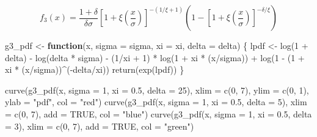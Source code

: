 \documentclass[
]{article}
\newenvironment{Shaded}{\begin{snugshade}}{\end{snugshade}}
\newcommand{\AttributeTok}[1]{\textcolor[rgb]{0.77,0.63,0.00}{#1}}
\newcommand{\ConstantTok}[1]{\textcolor[rgb]{0.00,0.00,0.00}{#1}}
\newcommand{\ControlFlowTok}[1]{\textcolor[rgb]{0.13,0.29,0.53}{\textbf{#1}}}
\newcommand{\DecValTok}[1]{\textcolor[rgb]{0.00,0.00,0.81}{#1}}
\newcommand{\FloatTok}[1]{\textcolor[rgb]{0.00,0.00,0.81}{#1}}
\newcommand{\FunctionTok}[1]{\textcolor[rgb]{0.00,0.00,0.00}{#1}}
\newcommand{\NormalTok}[1]{#1}
\newcommand{\OtherTok}[1]{\textcolor[rgb]{0.56,0.35,0.01}{#1}}
\newcommand{\SpecialCharTok}[1]{\textcolor[rgb]{0.00,0.00,0.00}{#1}}
\newcommand{\StringTok}[1]{\textcolor[rgb]{0.31,0.60,0.02}{#1}}
\begin{document}
\[f_3(x) = \frac{1 + \delta}{\delta\sigma}[1 + \xi (\frac{x}{\sigma})]^{-(1/\xi + 1)}\left(1 - [1+\xi(\frac{x}{\sigma})]^{-\delta/\xi} \right)\]

\begin{Shaded}
\begin{Highlighting}[]
\NormalTok{g3\_pdf }\OtherTok{\textless{}{-}} \ControlFlowTok{function}\NormalTok{(x, }\AttributeTok{sigma =}\NormalTok{ sigma, }\AttributeTok{xi =}\NormalTok{ xi, }\AttributeTok{delta =}\NormalTok{ delta) \{}
\NormalTok{    lpdf }\OtherTok{\textless{}{-}} \FunctionTok{log}\NormalTok{(}\DecValTok{1} \SpecialCharTok{+}\NormalTok{ delta) }\SpecialCharTok{{-}} \FunctionTok{log}\NormalTok{(delta }\SpecialCharTok{*}\NormalTok{ sigma) }\SpecialCharTok{{-}}\NormalTok{ (}\DecValTok{1}\SpecialCharTok{/}\NormalTok{xi }\SpecialCharTok{+} \DecValTok{1}\NormalTok{) }\SpecialCharTok{*}
        \FunctionTok{log}\NormalTok{(}\DecValTok{1} \SpecialCharTok{+}\NormalTok{ xi }\SpecialCharTok{*}\NormalTok{ (x}\SpecialCharTok{/}\NormalTok{sigma)) }\SpecialCharTok{+} \FunctionTok{log}\NormalTok{(}\DecValTok{1} \SpecialCharTok{{-}}\NormalTok{ (}\DecValTok{1} \SpecialCharTok{+}\NormalTok{ xi }\SpecialCharTok{*}\NormalTok{ (x}\SpecialCharTok{/}\NormalTok{sigma))}\SpecialCharTok{\^{}}\NormalTok{(}\SpecialCharTok{{-}}\NormalTok{delta}\SpecialCharTok{/}\NormalTok{xi))}
    \FunctionTok{return}\NormalTok{(}\FunctionTok{exp}\NormalTok{(lpdf))}
\NormalTok{\}}
\end{Highlighting}
\end{Shaded}

\begin{Shaded}
\begin{Highlighting}[]
\FunctionTok{curve}\NormalTok{(}\FunctionTok{g3\_pdf}\NormalTok{(x, }\AttributeTok{sigma =} \DecValTok{1}\NormalTok{, }\AttributeTok{xi =} \FloatTok{0.5}\NormalTok{, }\AttributeTok{delta =} \DecValTok{25}\NormalTok{), }\AttributeTok{xlim =} \FunctionTok{c}\NormalTok{(}\DecValTok{0}\NormalTok{,}
    \DecValTok{7}\NormalTok{), }\AttributeTok{ylim =} \FunctionTok{c}\NormalTok{(}\DecValTok{0}\NormalTok{, }\DecValTok{1}\NormalTok{), }\AttributeTok{ylab =} \StringTok{"pdf"}\NormalTok{, }\AttributeTok{col =} \StringTok{"red"}\NormalTok{)}
\FunctionTok{curve}\NormalTok{(}\FunctionTok{g3\_pdf}\NormalTok{(x, }\AttributeTok{sigma =} \DecValTok{1}\NormalTok{, }\AttributeTok{xi =} \FloatTok{0.5}\NormalTok{, }\AttributeTok{delta =} \DecValTok{5}\NormalTok{), }\AttributeTok{xlim =} \FunctionTok{c}\NormalTok{(}\DecValTok{0}\NormalTok{,}
    \DecValTok{7}\NormalTok{), }\AttributeTok{add =} \ConstantTok{TRUE}\NormalTok{, }\AttributeTok{col =} \StringTok{"blue"}\NormalTok{)}
\FunctionTok{curve}\NormalTok{(}\FunctionTok{g3\_pdf}\NormalTok{(x, }\AttributeTok{sigma =} \DecValTok{1}\NormalTok{, }\AttributeTok{xi =} \FloatTok{0.5}\NormalTok{, }\AttributeTok{delta =} \DecValTok{3}\NormalTok{), }\AttributeTok{xlim =} \FunctionTok{c}\NormalTok{(}\DecValTok{0}\NormalTok{,}
    \DecValTok{7}\NormalTok{), }\AttributeTok{add =} \ConstantTok{TRUE}\NormalTok{, }\AttributeTok{col =} \StringTok{"green"}\NormalTok{)}
\end{Highlighting}
\end{Shaded}
\end{document}
